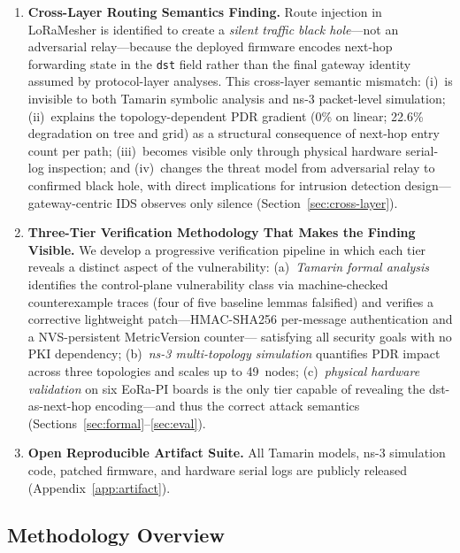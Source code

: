 \documentclass[preprint,12pt]{elsarticle}
\begin{document}
\begin{enumerate}

  \item \textbf{Cross-Layer Routing Semantics Finding.}
    Route injection in LoRaMesher is identified to create a
    \emph{silent traffic black hole}—not an adversarial relay—because
    the deployed firmware encodes next-hop forwarding state in the
    \texttt{dst} field rather than the final gateway identity assumed
    by protocol-layer analyses.
    This cross-layer semantic mismatch:
    (i)~is invisible to both Tamarin symbolic analysis and
    ns-3 packet-level simulation;
    (ii)~explains the topology-dependent PDR gradient
    (0\% on linear; 22.6\% degradation on tree and grid) as a
    structural consequence of next-hop entry count per path;
    (iii)~becomes visible only through physical hardware serial-log
    inspection; and
    (iv)~changes the threat model from adversarial relay to confirmed
    black hole, with direct implications for intrusion detection
    design—gateway-centric IDS observes only silence
    (Section~\ref{sec:cross-layer}).

  \item \textbf{Three-Tier Verification Methodology That Makes the
    Finding Visible.}
    We develop a progressive verification pipeline in which each tier
    reveals a distinct aspect of the vulnerability:
    (a)~\emph{Tamarin formal analysis} identifies the control-plane
    vulnerability class via machine-checked counterexample traces
    (four of five baseline lemmas falsified) and verifies a
    corrective lightweight patch—HMAC-SHA256 per-message
    authentication and a NVS-persistent MetricVersion counter—
    satisfying all security goals with no PKI dependency;
    (b)~\emph{ns-3 multi-topology simulation} quantifies PDR impact
    across three topologies and scales up to 49~nodes;
    (c)~\emph{physical hardware validation} on six EoRa-PI boards
    is the only tier capable of revealing the dst-as-next-hop
    encoding—and thus the correct attack semantics
    (Sections~\ref{sec:formal}–\ref{sec:eval}).

  \item \textbf{Open Reproducible Artifact Suite.}
    All Tamarin models, ns-3 simulation code, patched firmware,
    and hardware serial logs are publicly released
    (Appendix~\ref{app:artifact}).

\end{enumerate}

\subsection{Methodology Overview}
\label{sec:methodology}
\end{document}
